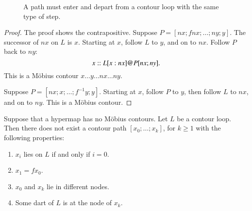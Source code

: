 \begin{figure}[htb]
\centering
{}
\caption{A path must enter and depart from a contour loop with the
same type of step.}
\label{fig:interior_nf}
\end{figure}


\begin{proof} The proof shows the contrapositive.  Suppose $P=[n x;f n
x;\ldots;n y;y]$.  The successor of $n x$ on $L$ is $x$.  Starting
at $x$, follow $L$ to $y$, and on to $n x$.  Follow $P$ back to $n
y$:
\begin{displaymath}
x::L[x:n x] {{\operatorname{@}}} P[ n x;ny].
\end{displaymath}  
This is a M\"obius contour $x\ldots y\ldots n x\ldots n y$.

Suppose $P=[n x;x;\ldots;f^{-1} y;y]$.  Starting at $x$, follow $P$ to
$y$, then follow $L$ to $n x$, and on to $n y$.  This is a M\"obius
contour.
\end{proof}


%


\begin{lemma}
Suppose that a hypermap has no M\"obius contours.  Let $L$ be a
contour loop.  Then there does not exist a contour path
$[x_0;\ldots;x_k]$, for $k\ge 1$ with the following properties:
\begin{enumerate}
\item $x_i$ lies on $L$ if and only if $i=0$.
\item $x_1 = f x_0$.
\item $x_0$ and $x_k$ lie in different nodes.
\item Some dart of $L$ is at the node of $x_k$.
\end{enumerate}
\end{lemma}

